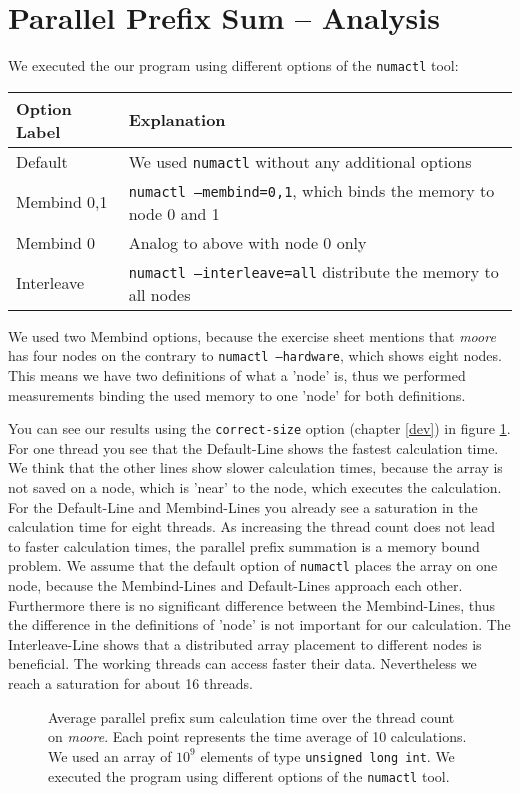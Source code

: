 \documentclass[oneside,a4paper]{scrartcl}
\begin{document}
\section{Parallel Prefix Sum -- Analysis}
We executed the our program using different options of the \texttt{numactl} tool:
\begin{center}
\begin{tabular}{l|l}
Option Label & Explanation\\\hline
Default & We used \texttt{numactl} without any additional options\\
Membind 0,1 & \texttt{numactl --membind=0,1}, which binds the memory to node 0 and 1\\
Membind 0 & Analog to above with node 0 only\\
Interleave & \texttt{numactl --interleave=all} distribute the memory to all nodes
\end{tabular}
\end{center}
We used two Membind options, because the exercise sheet mentions that \emph{moore} has four
nodes on the contrary to \texttt{numactl --hardware}, which shows eight nodes.
This means we have two definitions of what a 'node' is, thus we performed measurements
binding the used memory to one 'node' for both definitions.

You can see our results using the \texttt{correct-size} option (chapter \ref{dev}) in figure \ref{plot}.
For one thread you see that the Default-Line shows the fastest calculation time. We think
that the other lines show slower calculation times, because the array is not saved on a
node, which is 'near' to the node, which executes the calculation. For the Default-Line and Membind-Lines
you already see a saturation in the calculation time for eight threads. As increasing the
thread count does not lead to faster calculation times, the parallel prefix summation is
a memory bound problem. 
We assume that the default option of \texttt{numactl} places the array on one node,
because the Membind-Lines and Default-Lines approach each other.
Furthermore there is no significant difference between the Membind-Lines, thus the
difference in the definitions of 'node' is not important for our calculation.
The Interleave-Line shows that a distributed array placement to
different nodes is beneficial. The working threads can access faster their data. Nevertheless
we reach a saturation for about 16 threads.

\begin{figure}
	\centering
	\caption{Average parallel prefix sum calculation time over the thread count on \emph{moore}. Each point represents
		the time average of 10 calculations. We used an array of $10^9$ elements of type \texttt{unsigned long int}.
		We executed the program using different options of the \texttt{numactl} tool.}
	\label{plot}
\end{figure}
\end{document}

